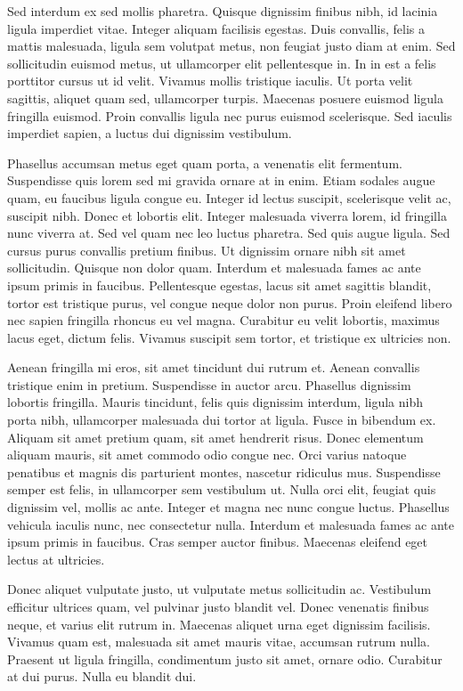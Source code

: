 Sed interdum ex sed mollis pharetra. Quisque dignissim finibus nibh, id lacinia
ligula imperdiet vitae. Integer aliquam facilisis egestas. Duis convallis, felis
a mattis malesuada, ligula sem volutpat metus, non feugiat justo diam at
enim. Sed sollicitudin euismod metus, ut ullamcorper elit pellentesque in. In in
est a felis porttitor cursus ut id velit. Vivamus mollis tristique iaculis. Ut
porta velit sagittis, aliquet quam sed, ullamcorper turpis. Maecenas posuere
euismod ligula fringilla euismod. Proin convallis ligula nec purus euismod
scelerisque. Sed iaculis imperdiet sapien, a luctus dui dignissim vestibulum.

Phasellus accumsan metus eget quam porta, a venenatis elit
fermentum. Suspendisse quis lorem sed mi gravida ornare at in enim. Etiam
sodales augue quam, eu faucibus ligula congue eu. Integer id lectus suscipit,
scelerisque velit ac, suscipit nibh. Donec et lobortis elit. Integer malesuada
viverra lorem, id fringilla nunc viverra at. Sed vel quam nec leo luctus
pharetra. Sed quis augue ligula. Sed cursus purus convallis pretium finibus. Ut
dignissim ornare nibh sit amet sollicitudin. Quisque non dolor quam. Interdum et
malesuada fames ac ante ipsum primis in faucibus. Pellentesque egestas, lacus
sit amet sagittis blandit, tortor est tristique purus, vel congue neque dolor
non purus. Proin eleifend libero nec sapien fringilla rhoncus eu vel
magna. Curabitur eu velit lobortis, maximus lacus eget, dictum felis. Vivamus
suscipit sem tortor, et tristique ex ultricies non.

Aenean fringilla mi eros, sit amet tincidunt dui rutrum et. Aenean convallis
tristique enim in pretium. Suspendisse in auctor arcu. Phasellus dignissim
lobortis fringilla. Mauris tincidunt, felis quis dignissim interdum, ligula nibh
porta nibh, ullamcorper malesuada dui tortor at ligula. Fusce in bibendum
ex. Aliquam sit amet pretium quam, sit amet hendrerit risus. Donec elementum
aliquam mauris, sit amet commodo odio congue nec. Orci varius natoque penatibus
et magnis dis parturient montes, nascetur ridiculus mus. Suspendisse semper est
felis, in ullamcorper sem vestibulum ut. Nulla orci elit, feugiat quis dignissim
vel, mollis ac ante. Integer et magna nec nunc congue luctus. Phasellus vehicula
iaculis nunc, nec consectetur nulla. Interdum et malesuada fames ac ante ipsum
primis in faucibus. Cras semper auctor finibus. Maecenas eleifend eget lectus at
ultricies.

Donec aliquet vulputate justo, ut vulputate metus sollicitudin ac. Vestibulum
efficitur ultrices quam, vel pulvinar justo blandit vel. Donec venenatis finibus
neque, et varius elit rutrum in. Maecenas aliquet urna eget dignissim
facilisis. Vivamus quam est, malesuada sit amet mauris vitae, accumsan rutrum
nulla. Praesent ut ligula fringilla, condimentum justo sit amet, ornare
odio. Curabitur at dui purus. Nulla eu blandit dui.

